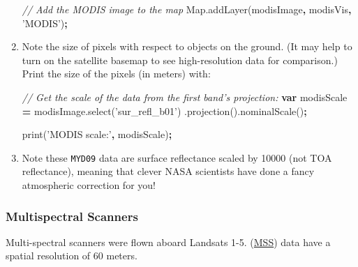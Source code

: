 \documentclass[
]{article}
\newenvironment{Shaded}{\begin{snugshade}}{\end{snugshade}}
\newcommand{\AttributeTok}[1]{\textcolor[rgb]{0.77,0.63,0.00}{#1}}
\newcommand{\CommentTok}[1]{\textcolor[rgb]{0.56,0.35,0.01}{\textit{#1}}}
\newcommand{\KeywordTok}[1]{\textcolor[rgb]{0.13,0.29,0.53}{\textbf{#1}}}
\newcommand{\NormalTok}[1]{#1}
\newcommand{\OperatorTok}[1]{\textcolor[rgb]{0.81,0.36,0.00}{\textbf{#1}}}
\newcommand{\StringTok}[1]{\textcolor[rgb]{0.31,0.60,0.02}{#1}}
\newcommand{\VariableTok}[1]{\textcolor[rgb]{0.00,0.00,0.00}{#1}}
\begin{document}
\begin{enumerate}
\begin{Shaded}
\begin{Highlighting}[]
\CommentTok{// Add the MODIS image to the map}
\VariableTok{Map}\NormalTok{.}\AttributeTok{addLayer}\NormalTok{(modisImage}\OperatorTok{,}\NormalTok{ modisVis}\OperatorTok{,} \StringTok{'MODIS'}\NormalTok{)}\OperatorTok{;}
\end{Highlighting}
\end{Shaded}
\item
  Note the size of pixels with respect to objects on the ground. (It may help to turn on the satellite basemap to see high-resolution data for comparison.) Print the size of the pixels (in meters) with:

\begin{Shaded}
\begin{Highlighting}[]
\CommentTok{// Get the scale of the data from the first band's projection:}
\KeywordTok{var}\NormalTok{ modisScale }\OperatorTok{=} \VariableTok{modisImage}\NormalTok{.}\AttributeTok{select}\NormalTok{(}\StringTok{'sur_refl_b01'}\NormalTok{)}
\NormalTok{.}\AttributeTok{projection}\NormalTok{().}\AttributeTok{nominalScale}\NormalTok{()}\OperatorTok{;}

\AttributeTok{print}\NormalTok{(}\StringTok{'MODIS scale:'}\OperatorTok{,}\NormalTok{ modisScale)}\OperatorTok{;}
\end{Highlighting}
\end{Shaded}
\item
  Note these \texttt{MYD09} data are surface reflectance scaled by 10000 (not TOA reflectance), meaning that clever NASA scientists have done a fancy atmospheric correction for you!
\end{enumerate}

\hypertarget{multispectral-scanners}{%
\subsubsection{Multispectral Scanners}\label{multispectral-scanners}}

Multi-spectral scanners were flown aboard Landsats 1-5. (\href{https://landsat.gsfc.nasa.gov/multispectral-scanner-system}{MSS}) data have a spatial resolution of 60 meters.
\end{document}
